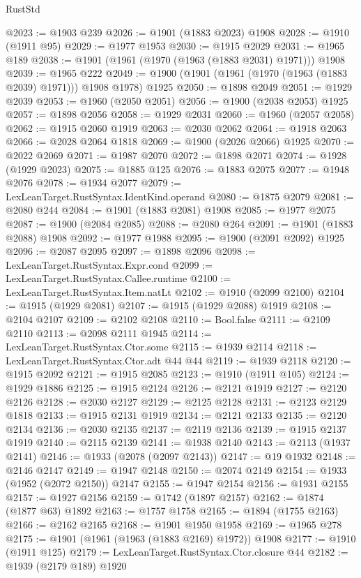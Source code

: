 \begin{lexlean}{RustStd}
\begin{coremodule}
@2023 := @1903 @239
@2026 := @1901 (@1883 @2023) @1908
@2028 := @1910 (@1911 @95)
@2029 := @1977 @1953
@2030 := @1915 @2029
@2031 := @1965 @189
@2038 := @1901 (@1961 (@1970 (@1963 (@1883 @2031) @1971))) @1908
@2039 := @1965 @222
@2049 := @1900 (@1901 (@1961 (@1970 (@1963 (@1883 @2039) @1971))) @1908 @1978) @1925
@2050 := @1898 @2049
@2051 := @1929 @2039
@2053 := @1960 (@2050 @2051)
@2056 := @1900 (@2038 @2053) @1925
@2057 := @1898 @2056
@2058 := @1929 @2031
@2060 := @1960 (@2057 @2058)
@2062 := @1915 @2060 @1919
@2063 := @2030 @2062
@2064 := @1918 @2063
@2066 := @2028 @2064 @1818
@2069 := @1900 (@2026 @2066) @1925
@2070 := @2022 @2069
@2071 := @1987 @2070
@2072 := @1898 @2071
@2074 := @1928 (@1929 @2023)
@2075 := @1885 @125
@2076 := @1883 @2075
@2077 := @1948 @2076
@2078 := @1934 @2077
@2079 := LexLeanTarget.RustSyntax.IdentKind.operand
@2080 := @1875 @2079
@2081 := @2080 @244
@2084 := @1901 (@1883 @2081) @1908
@2085 := @1977 @2075
@2087 := @1900 (@2084 @2085)
@2088 := @2080 @264
@2091 := @1901 (@1883 @2088) @1908
@2092 := @1977 @1988
@2095 := @1900 (@2091 @2092) @1925
@2096 := @2087 @2095
@2097 := @1898 @2096
@2098 := LexLeanTarget.RustSyntax.Expr.cond
@2099 := LexLeanTarget.RustSyntax.Callee.runtime
@2100 := LexLeanTarget.RustSyntax.Item.natLt
@2102 := @1910 (@2099 @2100)
@2104 := @1915 (@1929 @2081)
@2107 := @1915 (@1929 @2088) @1919
@2108 := @2104 @2107
@2109 := @2102 @2108
@2110 := Bool.false
@2111 := @2109 @2110
@2113 := @2098 @2111 @1945
@2114 := LexLeanTarget.RustSyntax.Ctor.some
@2115 := @1939 @2114
@2118 := LexLeanTarget.RustSyntax.Ctor.adt @44 @44
@2119 := @1939 @2118
@2120 := @1915 @2092
@2121 := @1915 @2085
@2123 := @1910 (@1911 @105)
@2124 := @1929 @1886
@2125 := @1915 @2124
@2126 := @2121 @1919
@2127 := @2120 @2126
@2128 := @2030 @2127
@2129 := @2125 @2128
@2131 := @2123 @2129 @1818
@2133 := @1915 @2131 @1919
@2134 := @2121 @2133
@2135 := @2120 @2134
@2136 := @2030 @2135
@2137 := @2119 @2136
@2139 := @1915 @2137 @1919
@2140 := @2115 @2139
@2141 := @1938 @2140
@2143 := @2113 (@1937 @2141)
@2146 := @1933 (@2078 (@2097 @2143))
@2147 := @19 @1932
@2148 := @2146 @2147
@2149 := @1947 @2148
@2150 := @2074 @2149
@2154 := @1933 (@1952 (@2072 @2150)) @2147
@2155 := @1947 @2154
@2156 := @1931 @2155
@2157 := @1927 @2156
@2159 := @1742 (@1897 @2157)
@2162 := @1874 (@1877 @63) @1892
@2163 := @1757 @1758
@2165 := @1894 (@1755 @2163)
@2166 := @2162 @2165
@2168 := @1901 @1950 @1958
@2169 := @1965 @278
@2175 := @1901 (@1961 (@1963 (@1883 @2169) @1972)) @1908
@2177 := @1910 (@1911 @125)
@2179 := LexLeanTarget.RustSyntax.Ctor.closure @44
@2182 := @1939 (@2179 @189) @1920

\end{coremodule}
\end{lexlean}
